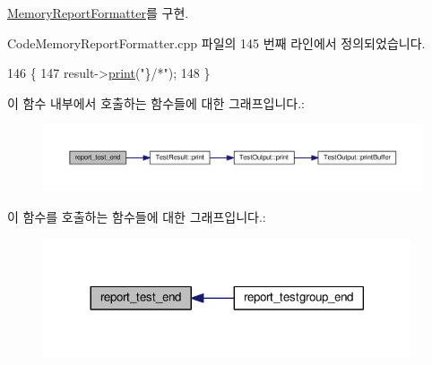 \hyperlink{class_memory_report_formatter_ace6fc7f4a7c7cb5d702018d91d85ae62}{Memory\+Report\+Formatter}를 구현.



Code\+Memory\+Report\+Formatter.\+cpp 파일의 145 번째 라인에서 정의되었습니다.


\begin{DoxyCode}
146 \{
147     result->\hyperlink{class_test_result_aeee8b15298e1baa2d0ced78c1fcb4b90}{print}(\textcolor{stringliteral}{"\}/*"});
148 \}
\end{DoxyCode}


이 함수 내부에서 호출하는 함수들에 대한 그래프입니다.\+:
\nopagebreak
\begin{figure}[H]
\begin{center}
\leavevmode
\includegraphics[width=350pt]{class_code_memory_report_formatter_a2b191434b124b93d8c0ed5a05e084e02_cgraph}
\end{center}
\end{figure}




이 함수를 호출하는 함수들에 대한 그래프입니다.\+:
\nopagebreak
\begin{figure}[H]
\begin{center}
\leavevmode
\includegraphics[width=308pt]{class_code_memory_report_formatter_a2b191434b124b93d8c0ed5a05e084e02_icgraph}
\end{center}
\end{figure}


